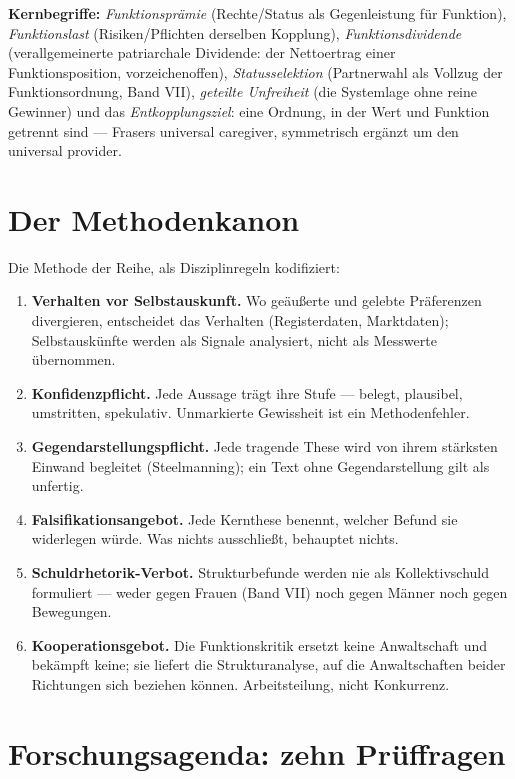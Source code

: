 \textbf{Kernbegriffe:} \emph{Funktionsprämie} (Rechte/Status als Gegenleistung
für Funktion), \emph{Funktionslast} (Risiken/Pflichten derselben Kopplung),
\emph{Funktionsdividende} (verallgemeinerte patriarchale Dividende: der
Nettoertrag einer Funktionsposition, vorzeichenoffen), \emph{Statusselektion}
(Partnerwahl als Vollzug der Funktionsordnung, Band VII),
\emph{geteilte Unfreiheit} (die Systemlage ohne reine Gewinner) und das
\emph{Entkopplungsziel}: eine Ordnung, in der Wert und Funktion getrennt sind
--- Frasers universal caregiver, symmetrisch ergänzt um den universal
provider.

\section{Der Methodenkanon}

Die Methode der Reihe, als Disziplinregeln kodifiziert:

\begin{enumerate}
\item \textbf{Verhalten vor Selbstauskunft.} Wo geäußerte und gelebte
Präferenzen divergieren, entscheidet das Verhalten (Registerdaten,
Marktdaten); Selbstauskünfte werden als Signale analysiert, nicht als Messwerte
übernommen.
\item \textbf{Konfidenzpflicht.} Jede Aussage trägt ihre Stufe --- belegt,
plausibel, umstritten, spekulativ. Unmarkierte Gewissheit ist ein
Methodenfehler.
\item \textbf{Gegendarstellungspflicht.} Jede tragende These wird von ihrem
stärksten Einwand begleitet (Steelmanning); ein Text ohne Gegendarstellung
gilt als unfertig.
\item \textbf{Falsifikationsangebot.} Jede Kernthese benennt, welcher Befund
sie widerlegen würde. Was nichts ausschließt, behauptet nichts.
\item \textbf{Schuldrhetorik-Verbot.} Strukturbefunde werden nie als
Kollektivschuld formuliert --- weder gegen Frauen (Band VII) noch gegen Männer
noch gegen Bewegungen.
\item \textbf{Kooperationsgebot.} Die Funktionskritik ersetzt keine
Anwaltschaft und bekämpft keine; sie liefert die Strukturanalyse, auf die
Anwaltschaften beider Richtungen sich beziehen können. Arbeitsteilung, nicht
Konkurrenz.
\end{enumerate}

\section{Forschungsagenda: zehn Prüffragen}

